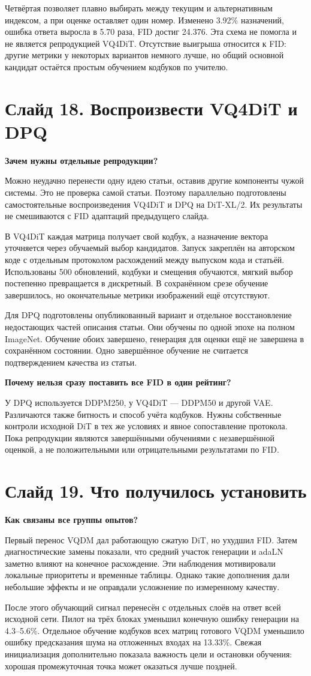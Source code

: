 \documentclass[a4paper,11pt]{article}
\newcommand{\slide}[2]{\clearpage\section*{Слайд #1. #2}}
\newcommand{\question}[1]{\par\textbf{#1}\par}
\begin{document}
Четвёртая позволяет плавно выбирать между текущим и альтернативным
индексом, а при оценке оставляет один номер. Изменено 3.92\% назначений,
ошибка ответа выросла в 5.70 раза, FID достиг 24.376. Эта схема не помогла
и не является репродукцией VQ4DiT. Отсутствие выигрыша относится к FID:
другие метрики у некоторых вариантов немного лучше, но общий основной
кандидат остаётся простым обучением кодбуков по учителю.

\slide{18}{Воспроизвести VQ4DiT и DPQ}
\question{Зачем нужны отдельные репродукции?}
Можно неудачно перенести одну идею статьи, оставив другие компоненты
чужой системы. Это не проверка самой статьи. Поэтому параллельно
подготовлены самостоятельные воспроизведения VQ4DiT и DPQ на DiT-XL/2.
Их результаты не смешиваются с FID адаптаций предыдущего слайда.

В VQ4DiT каждая матрица получает свой кодбук, а назначение вектора
уточняется через обучаемый выбор кандидатов. Запуск закреплён на авторском
коде с отдельным протоколом расхождений между выпуском кода и статьёй.
Использованы 500 обновлений, кодбуки и смещения обучаются, мягкий выбор
постепенно превращается в дискретный. В сохранённом срезе обучение
завершилось, но окончательные метрики изображений ещё отсутствуют.

Для DPQ подготовлены опубликованный вариант и отдельное восстановление
недостающих частей описания статьи. Они обучены по одной эпохе на полном
ImageNet. Обучение обоих завершено, генерация для оценки ещё не завершена
в сохранённом состоянии. Одно завершённое обучение не считается
подтверждением качества из статьи.

\question{Почему нельзя сразу поставить все FID в один рейтинг?}
У DPQ используется DDPM250, у VQ4DiT --- DDPM50 и другой VAE.
Различаются также битность и способ учёта кодбуков. Нужны собственные
контроли исходной DiT в тех же условиях и явное сопоставление протокола.
Пока репродукции являются завершёнными обучениями с незавершённой оценкой,
а не положительными или отрицательными результатами по FID.

\slide{19}{Что получилось установить}
\question{Как связаны все группы опытов?}
Первый перенос VQDM дал работающую сжатую DiT, но ухудшил FID.
Затем диагностические замены показали, что средний участок генерации
и adaLN заметно влияют на конечное расхождение. Эти наблюдения мотивировали
локальные приоритеты и временные таблицы. Однако такие дополнения дали
небольшие эффекты и не оправдали усложнение по измеренному качеству.

После этого обучающий сигнал перенесён с отдельных слоёв на ответ всей
исходной сети. Пилот на трёх блоках уменьшил конечную ошибку генерации
на 4.3--5.6\%. Отдельное обучение кодбуков всех матриц готового VQDM
уменьшило ошибку предсказания шума на отложенных входах на 13.33\%.
Свежая инициализация дополнительно показала важность цели и остановки
обучения: хорошая промежуточная точка может оказаться лучше поздней.
\end{document}

